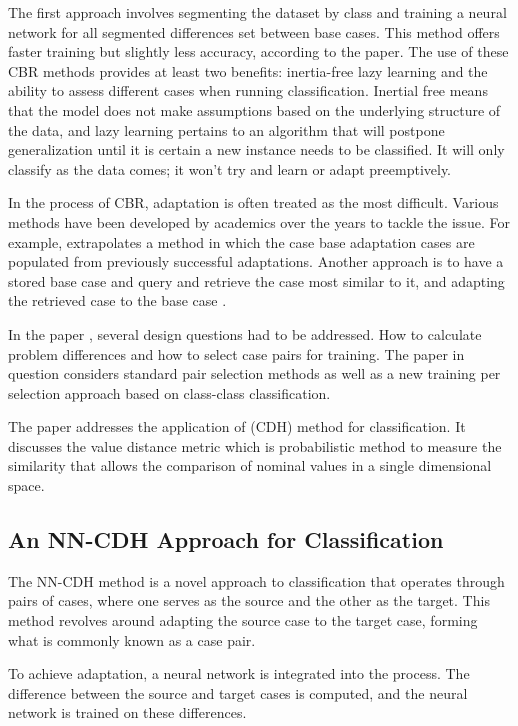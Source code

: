 \documentclass[a4paper, 12pt]{report}
\begin{document}
The first approach involves segmenting the dataset by class and training a neural network for all segmented differences set between base cases.
This method offers faster training but slightly less accuracy, according to the paper. The use of these CBR methods provides at least two benefits:
inertia-free lazy learning and the ability to assess different cases when running classification. Inertial free means that the model does not make
assumptions based on the underlying structure of the data, and lazy learning pertains to an algorithm that will postpone generalization until it
is certain a new instance needs to be classified. It will only classify as the data comes; it won't try and learn or adapt preemptively.

In the process of CBR, adaptation is often treated as the most difficult. Various methods have been developed by academics over the years to tackle the issue.
For example, \cite{leake1996acquiring} extrapolates a method in which the case base adaptation cases are populated from previously successful adaptations.
Another approach is to have a stored base case and query and retrieve the case most similar to it,
and adapting the retrieved case to the base case \cite{craw2006learning}.

In the paper \cite{ye2021learning}, several design questions had to be addressed.
How to calculate problem differences and how to select case pairs for training. The paper in question \cite{ye2021learning} considers standard
pair selection methods as well as a new training per selection approach based on class-class classification.

The paper \cite{ye2021learning} addresses the application of (CDH) method for classification.
It discusses the value distance metric which is  probabilistic method
to measure the similarity that allows the comparison of nominal values in a single dimensional space.

\subsection{An NN-CDH Approach for Classification}
The NN-CDH method is a novel approach to classification that operates through pairs of cases, where one serves as the source and the other as the target.
This method revolves around adapting the source case to the target case, forming what is commonly known as a case pair.

To achieve adaptation, a neural network is integrated into the process. The difference between the source and target cases is computed, and the neural network is trained on these differences.
\end{document}
